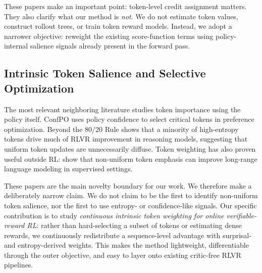 These papers make an important point: token-level credit assignment matters. They also clarify what our method is \emph{not}. We do not estimate token values, construct rollout trees, or train token reward models. Instead, we adopt a narrower objective: reweight the existing score-function terms using policy-internal salience signals already present in the forward pass.

\subsection{Intrinsic Token Salience and Selective Optimization}

The most relevant neighboring literature studies token importance using the policy itself. ConfPO \citep{yoon2025confpo} uses policy confidence to select critical tokens in preference optimization. Beyond the 80/20 Rule \citep{wang2025beyond8020} shows that a minority of high-entropy tokens drive much of RLVR improvement in reasoning models, suggesting that uniform token updates are unnecessarily diffuse. Token weighting has also proven useful outside RL: \citet{helm2025tokenweighting} show that non-uniform token emphasis can improve long-range language modeling in supervised settings.

These papers are the main novelty boundary for our work. We therefore make a deliberately narrow claim. We do not claim to be the first to identify non-uniform token salience, nor the first to use entropy- or confidence-like signals. Our specific contribution is to study \emph{continuous intrinsic token weighting for online verifiable-reward RL}: rather than hard-selecting a subset of tokens or estimating dense rewards, we continuously redistribute a sequence-level advantage with surprisal- and entropy-derived weights. This makes the method lightweight, differentiable through the outer objective, and easy to layer onto existing critic-free RLVR pipelines.
